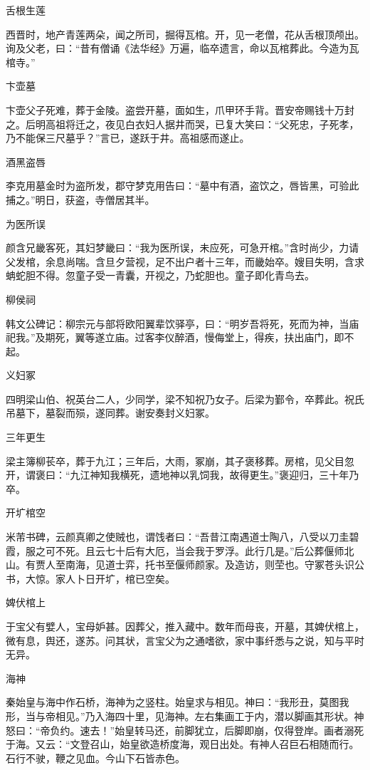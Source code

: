 \documentclass[a4paper,12pt,UTF8,twoside]{ctexbook}
\begin{document}
    舌根生莲
    
    西晋时，地产青莲两朵，闻之所司，掘得瓦棺。开，见一老僧，花从舌根顶颅出。询及父老，曰：“昔有僧诵《法华经》万遍，临卒遗言，命以瓦棺葬此。今造为瓦棺寺。”
    
    卞壶墓
    
    卞壶父子死难，葬于金陵。盗尝开墓，面如生，爪甲环手背。晋安帝赐钱十万封之。后明高祖将迁之，夜见白衣妇人据井而哭，已复大笑曰：“父死忠，子死孝，乃不能保三尺墓乎？”言已，遂跃于井。高祖感而遂止。
    
    酒黑盗唇
    
    李克用墓金时为盗所发，郡守梦克用告曰：“墓中有酒，盗饮之，唇皆黑，可验此捕之。”明日，获盗，寺僧居其半。
    
    为医所误
    
    颜含兄畿客死，其妇梦畿曰：“我为医所误，未应死，可急开棺。”含时尚少，力请父发棺，余息尚喘。含旦夕营视，足不出户者十三年，而畿始卒。嫂目失明，含求蚺蛇胆不得。忽童子受一青囊，开视之，乃蛇胆也。童子即化青鸟去。
    
    柳侯祠
    
    韩文公碑记：柳宗元与部将欧阳翼辈饮驿亭，曰：“明岁吾将死，死而为神，当庙祀我。”及期死，翼等遂立庙。过客李仪醉酒，慢侮堂上，得疾，扶出庙门，即不起。
    
    义妇冢
    
    四明梁山伯、祝英台二人，少同学，梁不知祝乃女子。后梁为鄞令，卒葬此。祝氏吊墓下，墓裂而殒，遂同葬。谢安奏封义妇冢。
    
    三年更生
    
    梁主簿柳苌卒，葬于九江；三年后，大雨，冢崩，其子褒移葬。房棺，见父目忽开，谓褒曰：“九江神知我横死，遗地神以乳饲我，故得更生。”褒迎归，三十年乃卒。
    
    开圹棺空
    
    米芾书碑，云颜真卿之使贼也，谓饯者曰：“吾昔江南遇道士陶八，八受以刀圭碧霞，服之可不死。且云七十后有大厄，当会我于罗浮。此行几是。”后公葬偃师北山。有贾人至南海，见道士弈，托书至偃师颜家。及造访，则茔也。守冢苍头识公书，大惊。家人卜日开圹，棺已空矣。
    
    婢伏棺上
    
    于宝父有嬖人，宝母妒甚。因葬父，推入藏中。数年而母丧，开墓，其婢伏棺上，微有息，舆还，遂苏。问其状，言宝父为之通嗜欲，家中事纤悉与之说，知与平时无异。
    
    海神
    
    秦始皇与海中作石桥，海神为之竖柱。始皇求与相见。神曰：“我形丑，莫图我形，当与帝相见。”乃入海四十里，见海神。左右集画工于内，潜以脚画其形状。神怒曰：“帝负约。速去！”始皇转马还，前脚犹立，后脚即崩，仅得登岸。画者溺死于海。又云：“文登召山，始皇欲造桥度海，观日出处。有神人召巨石相随而行。石行不驶，鞭之见血。今山下石皆赤色。
    
\end{document}
